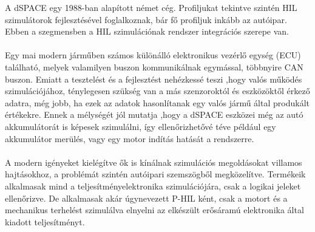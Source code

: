 A dSPACE egy 1988-ban alapított német cég. Profiljukat tekintve szintén HIL szimulátorok fejlesztésével foglalkoznak, bár fő profiljuk inkább az autóipar. Ebben a szegmensben a HIL szimulációnak rendszer integrációs szerepe van.

\paragraph{}
Egy mai modern járműben számos különálló elektronikus vezérlő egység (ECU) található, melyek valamilyen buszon kommunikálnak egymással, többnyire CAN buszon. Emiatt a tesztelést és a fejlesztést nehézkessé teszi ,hogy valós működés szimulációjához, ténylegesen szükség van a más szenzoroktól és eszközöktől érkező adatra, még jobb, ha ezek az adatok hasonlítanak egy valós jármű által produkált értékekre. Ennek a mélységét jól mutatja ,hogy a dSPACE eszközei még az autó akkumulátorát is képesek szimulálni, így ellenőrizhetővé téve például egy akkumulátor merülés, vagy egy motor indítás hatását a rendszerre.

\paragraph{}
A modern igényeket kielégítve ők is kínálnak szimulációs megoldásokat villamos hajtásokhoz, a problémát szintén autóipari szemszögből megközelítve. Termékeik alkalmasak mind a teljesítményelektronika szimulációjára, csak a logikai jeleket ellenőrizve. De alkalmasak akár úgynevezett P-HIL ként, csak a motort és a mechanikus terhelést szimulálva elnyelni az elkészült erősáramú elektronika által kiadott teljesítményt.